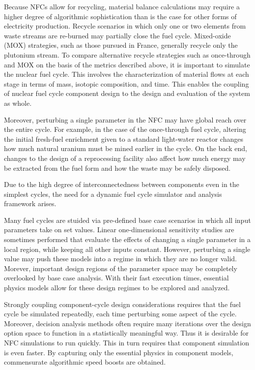 Because NFCs allow for recycling, material balance calculations may require a higher degree of
algorithmic sophistication than is the case for other forms of electricity production.  
Recycle scenarios in which only one or two 
elements from waste streams are re-burned may partially close the fuel cycle.  
Mixed-oxide (MOX) strategies, such as those pursued in France, 
generally recycle only the plutonium stream.  
To compare alternative recycle strategies such as once-through and MOX on the basis of the metrics 
described above, it is important to simulate the nuclear fuel cycle.  
This involves the characterization 
of material flows at each stage in terms of mass, isotopic composition, and time.  This enables 
the coupling of nuclear fuel cycle component design to the design and evaluation of the system as whole.  

Moreover, perturbing a single parameter in the NFC may have global reach over the entire cycle.
For example, in the case of the once-through fuel cycle, altering the initial fresh-fuel 
 enrichment given to a standard light-water reactor changes how much natural 
uranium must be mined earlier in the cycle.  On the back end, changes to the design of 
a reprocessing facility also affect 
how much energy may be extracted from the fuel form and how the waste may be safely disposed.

Due to the high degree of interconnectedness between components 
even in the simplest cycles, the need for a dynamic 
fuel cycle simulator and analysis framework arises.  

Many fuel cycles are stuided via pre-defined base case scenarios in which all input parameters
take on set values.  Linear one-dimensional sensitivity studies are sometimes performed that evaluate
the effects of changing a single parameter in a local region, while keeping all other inputs
constant.  However, perturbing a single value may push these models into a regime in which 
they are no longer valid.  Morever, important design regions of the parameter space may be 
completely overlooked by base case analysis.  With their fast execution times, essential 
physics models allow for these design regimes to be explored and analyzed.

Strongly coupling component-cycle design considerations requires that the fuel cycle be 
simulated repeatedly, each time perturbing some aspect of the cycle.  
Moreover, decision analysis methods often require many iterations over the design option space
to function in a statistically meaningful way.
Thus it is desirable for
NFC simulations to run quickly.  This in turn requires that component simulation is even faster. 
By capturing only the essential physics in component models, commensurate algorithmic speed 
boosts are obtained.

